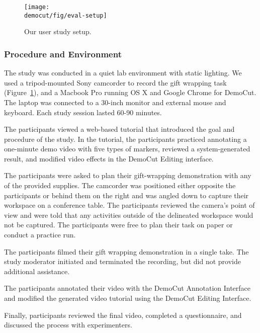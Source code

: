 \begin{figure}[t]
  \centering
\texttt{[image: \\democut/fig/eval-setup]}
  \caption{Our user study setup.}
  \label{fig:eval-setup}
\end{figure}

\subsubsection{Procedure and Environment}
The study was conducted in a quiet lab environment with static lighting. We used a tripod-mounted Sony camcorder to record the gift wrapping task (Figure~\ref{fig:eval-setup}), and a Macbook Pro running OS X and Google Chrome for DemoCut. The laptop was connected to a 30-inch monitor and external mouse and keyboard. Each study session lasted 60-90 minutes.

 The participants viewed a web-based tutorial that introduced the goal and procedure of the study. In the tutorial, the participants practiced annotating a one-minute demo video with five types of markers, reviewed a system-generated result, and modified video effects in the DemoCut Editing interface.

 The participants were asked to plan their gift-wrapping demonstration with any of the provided supplies. The camcorder was positioned either opposite the participants or behind them on the right and was angled down to capture their workspace on a conference table. The participants reviewed the camera's point of view and were told that any activities outside of the delineated workspace would not be captured. The participants were free to plan their task on paper or conduct a practice run. %

 The participants filmed their gift wrapping demonstration in a single take. The study moderator initiated and terminated the recording, but did not provide additional assistance.

 The participants annotated their video with the DemoCut Annotation Interface and modified the generated video tutorial using the DemoCut Editing Interface.

 Finally, participants reviewed the final video, completed a questionnaire, and discussed the process with experimenters.
